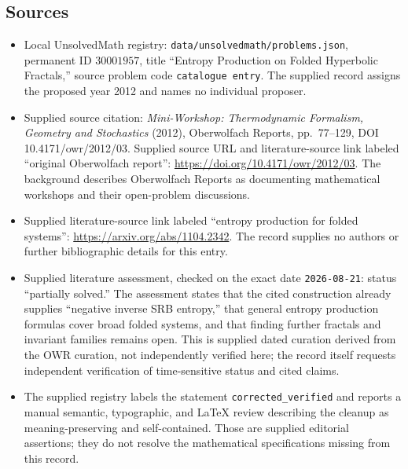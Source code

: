 \documentclass[11pt]{article}
\begin{document}
\subsection{Sources}
\begin{itemize}
\item Local UnsolvedMath registry: \texttt{data/unsolvedmath/problems.json}, permanent ID \(30001957\), title ``Entropy Production on Folded Hyperbolic Fractals,'' source problem code \texttt{catalogue entry}. The supplied record assigns the proposed year 2012 and names no individual proposer.
\item Supplied source citation: \emph{Mini-Workshop: Thermodynamic Formalism, Geometry and Stochastics} (2012), Oberwolfach Reports, pp.\ 77--129, DOI 10.4171/owr/2012/03. Supplied source URL and literature-source link labeled ``original Oberwolfach report'': \url{https://doi.org/10.4171/owr/2012/03}. The background describes Oberwolfach Reports as documenting mathematical workshops and their open-problem discussions.
\item Supplied literature-source link labeled ``entropy production for folded systems'': \url{https://arxiv.org/abs/1104.2342}. The record supplies no authors or further bibliographic details for this entry.
\item Supplied literature assessment, checked on the exact date \texttt{2026-08-21}: status ``partially solved.'' The assessment states that the cited construction already supplies ``negative inverse SRB entropy,'' that general entropy production formulas cover broad folded systems, and that finding further fractals and invariant families remains open. This is supplied dated curation derived from the OWR curation, not independently verified here; the record itself requests independent verification of time-sensitive status and cited claims.
\item The supplied registry labels the statement \texttt{corrected\_verified} and reports a manual semantic, typographic, and LaTeX review describing the cleanup as meaning-preserving and self-contained. Those are supplied editorial assertions; they do not resolve the mathematical specifications missing from this record.
\end{itemize}
\end{document}
